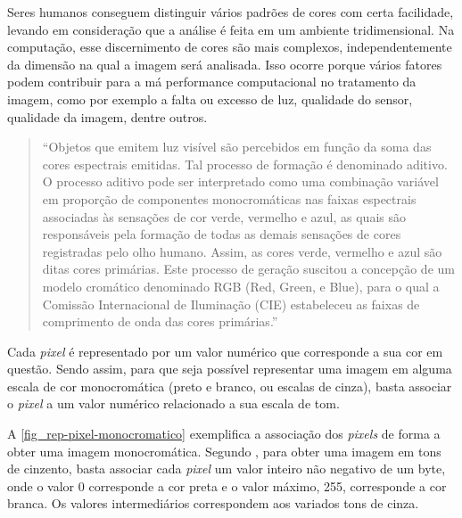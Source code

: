 Seres humanos conseguem distinguir vários padrões de cores com certa facilidade, levando em consideração que a análise é feita em um ambiente tridimensional. Na computação, esse discernimento de cores são mais complexos, independentemente da dimensão na qual a imagem será analisada. Isso ocorre porque vários fatores podem contribuir para a má performance computacional no tratamento da imagem, como por exemplo a falta ou excesso de luz, qualidade do sensor, qualidade da imagem, dentre outros.

\begin{quotation}
“Objetos que emitem luz visível são percebidos em função da soma das cores espectrais emitidas. Tal processo de formação é denominado aditivo. O processo aditivo pode ser interpretado como uma combinação variável em proporção de componentes monocromáticas nas faixas espectrais associadas às sensações de cor verde, vermelho e azul, as quais são responsáveis pela formação de todas as demais sensações de cores registradas pelo olho humano. Assim, as cores verde, vermelho e azul são ditas cores primárias. Este processo de geração suscitou a concepção de um modelo cromático denominado RGB (Red, Green, e Blue), para o qual a Comissão Internacional de Iluminação (CIE) estabeleceu as faixas de comprimento de onda das cores primárias.” \cite{QUEIROZ2006}
\end{quotation}

Cada \textit{pixel} é representado por um valor numérico que corresponde a sua cor em questão. Sendo assim, para que seja possível representar uma imagem em alguma escala de cor monocromática (preto e branco, ou escalas de cinza), basta associar o \textit{pixel} a um valor numérico relacionado a sua escala de tom.

A \autoref{fig_rep-pixel-monocromatico} exemplifica a associação dos \textit{pixels} de forma a obter uma imagem monocromática. Segundo , para obter uma imagem em tons de cinzento, basta associar cada \textit{pixel} um valor inteiro não negativo de um byte, onde o valor 0 corresponde a cor preta e o valor máximo, 255, corresponde a cor branca. Os valores intermediários correspondem aos variados tons de cinza.

